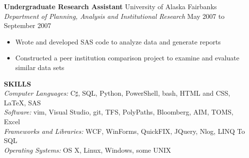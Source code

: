 \documentclass{article}
\begin{document}
\begin{flushleft}
\hspace{20pt}
\textbf{Undergraduate Research Assistant} \hfill University of Alaska Fairbanks\\
\hspace{20pt}
\textit{Department of Planning, Analysis and Institutional Research} \hfill May 2007 to September 2007\\
\begin{itemize}[leftmargin=50pt,itemsep=-2pt]
\item Wrote and developed SAS code to analyze data and generate reports
\item Constructed a peer institution comparison project to examine and evaluate similar data sets
\end{itemize}

\vspace{5pt}
\textbf{SKILLS}\\
\hspace{20pt}
\textit{Computer Languages:} C$\sharp$, SQL, Python, PowerShell, bash, HTML and CSS, \LaTeX, SAS\\
\hspace{20pt}
\textit{Software:} vim, Visual Studio, git, TFS, PolyPaths, Bloomberg, AIM, TOMS, Excel\\
\hspace{20pt}
\textit{Frameworks and Libraries:} WCF, WinForms, QuickFIX, JQuery, Nlog, LINQ To SQL\\
\hspace{20pt}
\textit{Operating Systems:} OS X, Linux, Windows, some UNIX\\

\end{flushleft}
\end{document}
